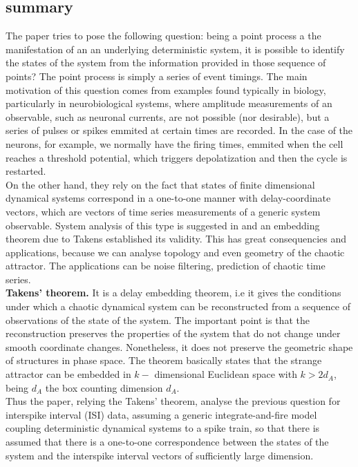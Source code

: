 \documentclass[10pt]{article}
\begin{document}
\subsection{summary}
The paper \cite{interspike} tries to pose the following question: being a point process a the manifestation of an an underlying deterministic system, it is possible to identify the states of the system from the information provided in those sequence of points? The point process is simply a series of event timings. The main motivation of this question comes from examples found typically in biology, particularly in neurobiological systems, where amplitude measurements of an observable, such as neuronal currents, are not possible (nor desirable), but a series of pulses or spikes emmited at certain times are recorded. In the case of the neurons, for example, we normally have the firing times, emmited when the cell reaches a threshold potential, which triggers depolatization and then the cycle is restarted.\\
On the other hand, they rely on the fact that states of finite dimensional dynamical systems correspond in a one-to-one manner with delay-coordinate vectors, which are vectors of time series measurements of a generic system observable. System analysis of this type is suggested in and an embedding theorem due to Takens established its validity. This has great consequencies and applications, because we can analyse topology and even geometry of the chaotic attractor. The applications can be noise filtering, prediction of chaotic time series.\\
\textbf{Takens' theorem.} \cite{takens} It is a delay embedding theorem, i.e it gives the conditions under which a chaotic dynamical system can be reconstructed from a sequence of observations of the state of the system. The important point is that the reconstruction preserves the properties of the system that do not change under smooth coordinate changes. Nonetheless, it does not preserve the geometric shape of structures in phase space. The theorem basically states that the strange attractor can be embedded in $k-$ dimensional Euclidean space with $k>2d_A$, being $d_A$ the box counting dimension $d_A$.\\
Thus the paper, relying the Takens' theorem, analyse the previous question for interspike interval (ISI) data, assuming a generic integrate-and-fire model coupling deterministic dynamical systems to a spike train, so that there is assumed that there is a one-to-one correspondence between the states of the system and the interspike interval vectors of sufficiently large dimension. \\
\end{document}
